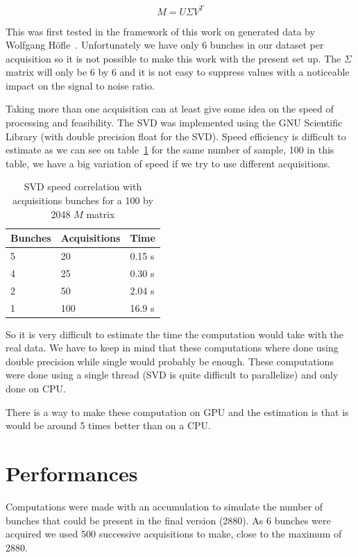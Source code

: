 $$M = U \Sigma V^{T}$$ 

This was first tested in the framework of this work on generated data by Wolfgang H{\"o}f\/le~\cite{HofleEvian10}. Unfortunately we have only 6 bunches in our dataset per acquisition so it is not possible to make this work with the present set up. The $\Sigma$ matrix will only be 6 by 6 and it is not easy to suppress values with a noticeable impact on the signal to noise ratio.

Taking more than one acquisition can at least give some idea on the speed of processing and feasibility. The SVD was implemented using the GNU Scientific Library (with double precision float for the SVD). Speed efficiency is difficult to estimate as we can see on table~\ref{tab:SVD} for the same number of sample, 100 in this table, we have a big variation of speed if we try to use different acquisitions.

\begin{table}[H]
\caption{SVD speed correlation with acquisitions bunches for a 100 by 2048 $M$ matrix}
\label{tab:SVD}
\centering
\begin{tabular}{|l|l|l|}
\hline
Bunches & Acquisitions & Time \\
\hline
5 & 20 & 0.15 s \\
4 & 25 & 0.30 s \\
2 & 50 & 2.04 s \\
1 & 100 & 16.9 s \\
\hline
\end{tabular}
\end{table}

So it is very difficult to estimate the time the computation would take with the real data. We have to keep in mind that these computations where done using double precision while single would probably be enough. These computations were done using a single thread (SVD is quite difficult to parallelize) and only done on \gls{CPU}.

There is a way to make these computation on \gls{GPU}\cite{Lahabar09} and the estimation is that is would be around 5 times better than on a \gls{CPU}.

\section{Performances}
\label{sec:perf}

Computations were made with an accumulation to simulate the number of bunches that could be present in the final version (2880). As 6 bunches were acquired we used 500 successive acquisitions to make, close to the maximum of 2880.

